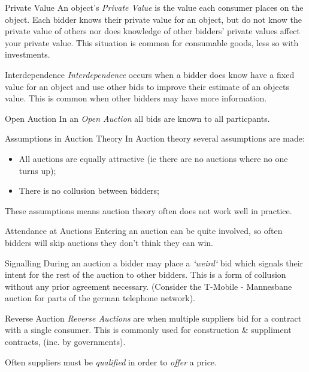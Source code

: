 \documentclass[11pt,a4paper]{article}
\begin{document}
\begin{definition}{Private Value}
  An object's \textit{Private Value} is the value each consumer places on the object. Each bidder knows their private value for an object, but do not know the private value of others nor does knowledge of other bidders' private values affect your private value. This situation is common for consumable goods, less so with investments.
\end{definition}

\begin{definition}{Interdependence}
  \textit{Interdependence} occurs when a bidder does know have a fixed value for an object and use other bids to improve their estimate of an objects value. This is common when other bidders may have more information.
\end{definition}

\begin{definition}{Open Auction}
  In an \textit{Open Auction} all bids are known to all particpants.
\end{definition}

\begin{remark}{Assumptions in Auction Theory}
  In Auction theory several assumptions are made:
  \begin{itemize}
    \item All auctions are equally attractive (ie there are no auctions where no one turns up);
    \item There is no collusion between bidders;
  \end{itemize}
  These assumptions means auction theory often does not work well in practice.
\end{remark}

\begin{remark}{Attendance at Auctions}
  Entering an auction can be quite involved, so often bidders will skip auctions they don't think they can win.
\end{remark}

\begin{definition}{Signalling}
  During an auction a bidder may place a \textit{`weird`} bid which signals their intent for the rest of the auction to other bidders. This is a form of collusion without any prior agreement necessary. (Consider the T-Mobile - Mannesbane auction for parts of the german telephone network).
\end{definition}

\begin{definition}{Reverse Auction}
  \textit{Reverse Auctions} are when multiple suppliers bid for a contract with a single consumer. This is commonly used for construction \& suppliment contracts, (inc. by governments).
  \par Often suppliers must be \textit{qualified} in order to \textit{offer} a price.
\end{definition}
\end{document}
